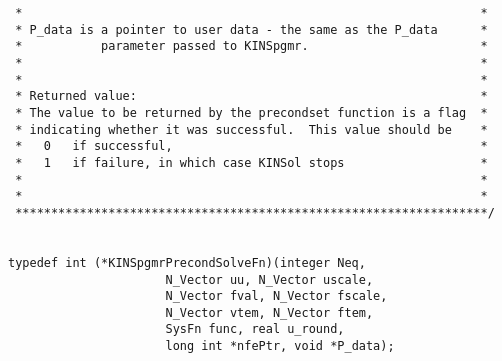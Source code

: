 \begin{verbatim}
 *                                                                *
 * P_data is a pointer to user data - the same as the P_data      *
 *           parameter passed to KINSpgmr.                        *
 *                                                                *
 *                                                                *
 * Returned value:                                                *
 * The value to be returned by the precondset function is a flag  *
 * indicating whether it was successful.  This value should be    *
 *   0   if successful,                                           *
 *   1   if failure, in which case KINSol stops                   *
 *                                                                *
 *                                                                *
 ******************************************************************/
  

typedef int (*KINSpgmrPrecondSolveFn)(integer Neq,
				      N_Vector uu, N_Vector uscale, 
				      N_Vector fval, N_Vector fscale, 
				      N_Vector vtem, N_Vector ftem,
				      SysFn func, real u_round,
				      long int *nfePtr, void *P_data);
 

\end{verbatim}
